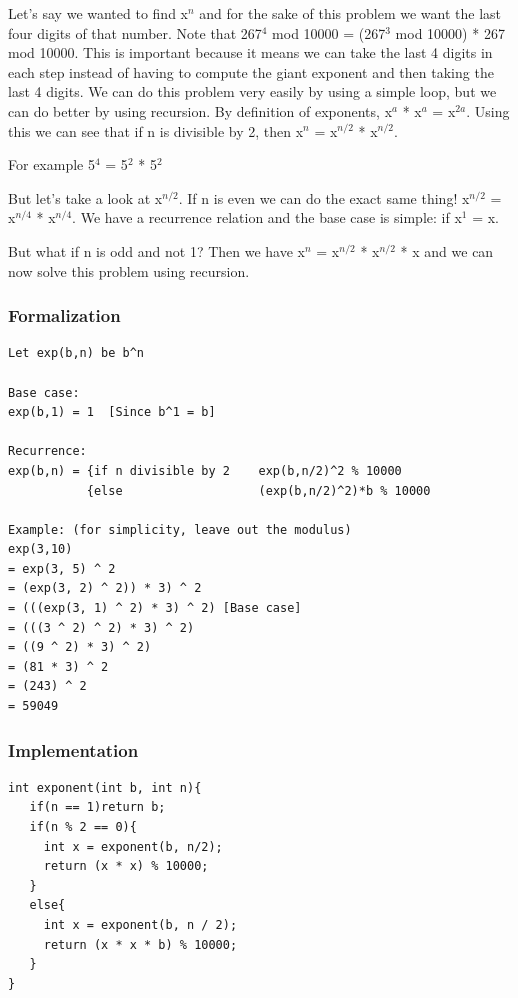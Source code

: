 \documentclass[11pt,oneside]{book}
\begin{document}
Let's say we wanted to find x$^{n}$ and for the sake of this problem we want the last four digits of that number. Note that 267$^{4}$ mod 10000 = (267$^{3}$ mod 10000) * 267 mod 10000. This is important because it means we can take the last 4 digits in each step instead of having to compute the giant exponent and then taking the last 4 digits. We can do this problem very easily by using a simple loop, but we can do better by using recursion. By definition of exponents, x$^{a}$ * x$^{a}$ = x$^{2a}$. Using this we can see that if n is divisible by 2, then x$^{n}$ = x$^{n/2}$ * x$^{n/2}$.

For example 5$^{4}$ = 5$^{2}$ * 5$^{2}$

But let's take a look at x$^{n/2}$. If n is even we can do the exact same thing! x$^{n/2}$ = x$^{n/4}$ * x$^{n/4}$. We have a recurrence relation and the base case is simple: if x$^{1}$ = x.

But what if n is odd and not 1? Then we have x$^{n}$ = x$^{n/2}$ * x$^{n/2}$ * x and we can now solve this problem using recursion.

\subsubsection{Formalization}

\begin{lstlisting}
Let exp(b,n) be b^n

Base case:
exp(b,1) = 1  [Since b^1 = b]

Recurrence:
exp(b,n) = {if n divisible by 2    exp(b,n/2)^2 % 10000
           {else                   (exp(b,n/2)^2)*b % 10000

Example: (for simplicity, leave out the modulus)
exp(3,10)
= exp(3, 5) ^ 2
= (exp(3, 2) ^ 2)) * 3) ^ 2
= (((exp(3, 1) ^ 2) * 3) ^ 2) [Base case]
= (((3 ^ 2) ^ 2) * 3) ^ 2)
= ((9 ^ 2) * 3) ^ 2)
= (81 * 3) ^ 2
= (243) ^ 2
= 59049
\end{lstlisting}

\subsubsection{Implementation}

\begin{lstlisting}
int exponent(int b, int n){
   if(n == 1)return b;
   if(n % 2 == 0){
     int x = exponent(b, n/2);
     return (x * x) % 10000;
   }
   else{
     int x = exponent(b, n / 2);
     return (x * x * b) % 10000;
   }
}

\end{lstlisting}
\end{document}
